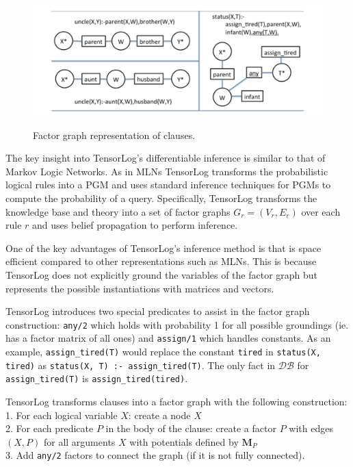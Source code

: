 \documentclass[11pt]{article}
\begin{document}
\begin{figure}
	\begin{center}
		\includegraphics[width=12cm, height=5cm]{tensorlog}
		\caption{Factor graph representation of clauses.}
	\end{center}
\end{figure}
The key insight into TensorLog's differentiable inference is similar to that of Markov Logic Networks.  As in MLNs TensorLog transforms the probabilistic logical rules into a PGM and uses standard inference techniques for PGMs to compute the probability of a query.  Specifically, TensorLog transforms the knowledge base and theory into a set of factor graphs $G_r = (V_r, E_r)$ over each rule $r$ and uses belief propagation to perform inference.

One of the key advantages of TensorLog's inference method is that is space efficient compared to other representations such as MLNs.  This is because TensorLog does not explicitly ground the variables of the factor graph but represents the possible instantiations with matrices and vectors.

TensorLog introduces two special predicates to assist in the factor graph construction: \verb!any/2! which holds with probability 1 for all possible groundings (ie. has a factor matrix of all ones) and \verb!assign/1! which handles constants.  As an example, \verb!assign_tired(T)! would replace the constant \verb!tired! in \verb!status(X, tired)! as \verb!status(X, T) :- assign_tired(T)!.  The only fact in $\mathcal{DB}$ for \verb!assign_tired(T)! is \verb!assign_tired(tired)!.

TensorLog transforms clauses into a factor graph with the following construction: \\
1. For each logical variable $X$: create a node $X$\\
2. For each predicate $P$ in the body of the clause: create a factor $P$ with edges $(X, P)$ for all arguments $X$ with potentials defined by $\textbf{M}_P$\\
3. Add \verb!any/2! factors to connect the graph (if it is not fully connected).
\end{document}
